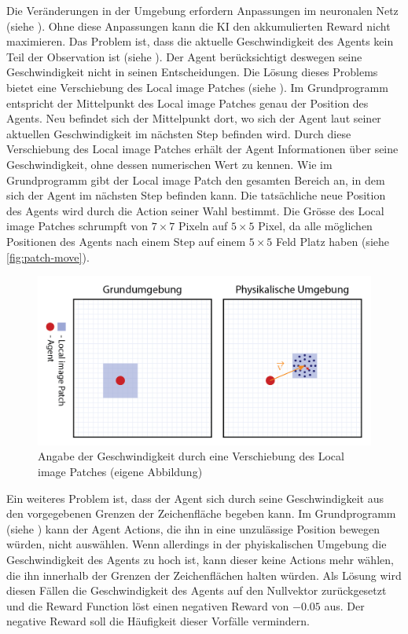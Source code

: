 Die Veränderungen in der Umgebung erfordern Anpassungen im neuronalen Netz
(siehe ). Ohne diese Anpassungen kann die KI den
akkumulierten Reward nicht maximieren. Das Problem ist, dass die aktuelle
Geschwindigkeit des Agents kein Teil der Observation ist (siehe
). Der Agent berücksichtigt deswegen seine
Geschwindigkeit nicht in seinen Entscheidungen. Die Lösung dieses Problems
bietet eine Verschiebung des Local image Patches (siehe ).
Im Grundprogramm entspricht der Mittelpunkt des Local image Patches genau der
Position des Agents. Neu befindet sich der Mittelpunkt dort, wo sich der Agent
laut seiner aktuellen Geschwindigkeit im nächsten Step befinden wird. Durch
diese Verschiebung des Local image Patches erhält der Agent Informationen über
seine Geschwindigkeit, ohne dessen numerischen Wert zu kennen. Wie im
Grundprogramm gibt der Local image Patch den gesamten Bereich an, in dem sich
der Agent im nächsten Step befinden kann. Die tatsächliche neue Position des
Agents wird durch die Action seiner Wahl bestimmt. Die Grösse des Local image
Patches schrumpft von $7\times7$ Pixeln auf $5\times5$ Pixel, da alle möglichen
Positionen des Agents nach einem Step auf einem $5\times5$ Feld Platz haben
(siehe \autoref{fig:patch-move}). 

\begin{figure}[!ht]
  \centering
  \includegraphics[width=\textwidth]{images/methode/patch-move.png}
  \caption{Angabe der Geschwindigkeit durch eine Verschiebung des Local image Patches (eigene Abbildung)}
  \label{fig:patch-move}
\end{figure}


Ein weiteres Problem ist, dass der Agent sich durch seine Geschwindigkeit aus
den vorgegebenen Grenzen der Zeichenfläche begeben kann. Im Grundprogramm  
(siehe ) kann der Agent Actions, die ihn in eine
unzulässige Position bewegen würden, nicht auswählen. Wenn allerdings in der
phyiskalischen Umgebung die Geschwindigkeit des Agents zu hoch ist, kann dieser
keine Actions mehr wählen, die ihn innerhalb der Grenzen der Zeichenflächen
halten würden. Als Lösung wird diesen Fällen die Geschwindigkeit des Agents auf den
Nullvektor zurückgesetzt und die Reward Function löst einen negativen Reward von
$-0.05$ aus. Der negative Reward soll die Häufigkeit dieser Vorfälle vermindern.


